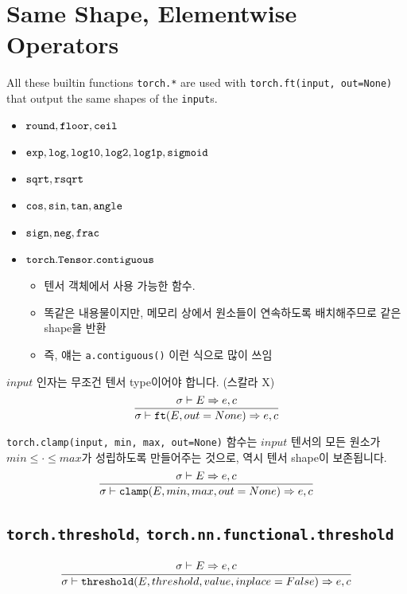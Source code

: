 \documentclass{article}
\begin{document}
\section*{Same Shape, Elementwise Operators}
All these builtin functions \texttt{torch.*} are used with
\texttt{torch.ft(input, out=None)} that output the same shapes of the
\texttt{input}s.
\begin{itemize}
  \item $\mathtt{round}, \mathtt{floor}, \mathtt{ceil}$
  \item $\mathtt{exp}, \mathtt{log}, \mathtt{log10}, \mathtt{log2}, \mathtt{log1p},
  \mathtt{sigmoid}$
  \item $\mathtt{sqrt}, \mathtt{rsqrt}$
  \item $\mathtt{cos}, \mathtt{sin}, \mathtt{tan}, \mathtt{angle}$
  \item $\mathtt{sign}, \mathtt{neg}, \mathtt{frac}$
  \item $\mathtt{torch.Tensor.contiguous}$
  \begin{itemize}
    \item 텐서 객체에서 사용 가능한 함수.
    \item 똑같은 내용물이지만, 메모리 상에서 원소들이 연속하도록 배치해주므로 같은 shape을 반환
    \item 즉, 얘는 \texttt{a.contiguous()} 이런 식으로 많이 쓰임
  \end{itemize}
\end{itemize}
$input$ 인자는 무조건 텐서 type이어야 합니다. (스칼라 X)
\begin{align*}
  \frac
  {
    \sigma \vdash E \Rightarrow e, c
  }
  {
    \sigma \vdash \mathtt{ft(}E, out=None\mathtt{)} \Rightarrow e, c
  }
\end{align*}

\texttt{torch.clamp(input, min, max, out=None)} 함수는 $input$ 텐서의 모든
원소가 $min \leq \cdot \leq max$가 성립하도록 만들어주는 것으로, 역시 텐서
shape이 보존됩니다.
\begin{align*}
  \frac
  {
    \sigma \vdash E \Rightarrow e, c
  }
  {
    \sigma \vdash \mathtt{clamp(}E, min, max, out=None\mathtt{)} \Rightarrow e, c
  }
\end{align*}

\subsection*{\texttt{torch.threshold}, \texttt{torch.nn.functional.threshold}}
\begin{align*}
  \frac
  {
    \begin{array}{l}
      \sigma \vdash E \Rightarrow e, c
    \end{array}
  }
  {
    \sigma \vdash \mathtt{threshold(}E, threshold, value, inplace=False\mathtt{)} \Rightarrow e, c
  }
\end{align*}
\end{document}
